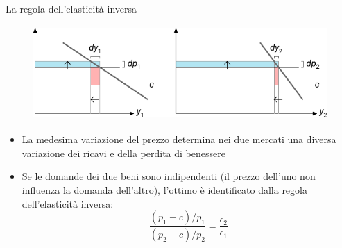 \documentclass[aspectratio=64,11pt]{beamer}
\begin{document}
\begin{frame}{La regola dell'elasticità inversa}
\begin{figure}[htbp]
\centering
\includegraphics[height=3.6cm]{./figure/ramsey-3-color.pdf}
\end{figure}

\begin{itemize}
\item La medesima variazione del prezzo determina nei due mercati una diversa variazione dei ricavi e
della perdita di benessere
\item Se le domande dei due beni sono indipendenti (il prezzo dell'uno non influenza la domanda dell'altro), l'ottimo è identificato dalla regola
dell'elasticità inversa:
\begin{equation*}
\frac{(p_1-c)/p_1}{(p_2-c)/p_2}=\frac{\epsilon_2}{\epsilon_1}
\end{equation*}
\end{itemize}
\end{frame}
\end{document}
